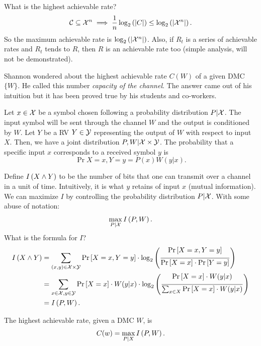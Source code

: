 What is the highest achievable rate?
\begin{equation*}
	\mathcal{C} \subseteq \mathcal{X}^n \implies \frac{1}{n} \log_2 \left( {\left|{C}\right|} \right) \le \log_2 \left( {\left|{\mathcal{X}^n}\right|} \right).
\end{equation*}
So the maximum achievable rate is $\log_2 \left( {\left|{\mathcal{X}^n}\right|} \right)$.
Also, if $R_t$ is a series of achievable rates and $R_t$ tends to $R$, then $R$ is an achievable rate too (simple analysis, will not be demonstrated).

Shannon wondered about the highest achievable rate $C(W)$ of a given DMC $\{W\}$.
He called this number \emph{capacity of the channel}.
The answer came out of his intuition but it has been proved true by his students and co-workers.

Let $x \in \mathcal{X}$ be a symbol chosen following a probability distribution $P|\mathcal{X}$.
The input symbol will be sent through the channel $W$ and the output is conditioned by $W$.
Let $Y$ be a \ac{RV} $Y \in \mathcal{Y}$ representing the output of $W$ with respect to input $X$.
Then, we have a joint distribution $P, W | \mathcal{X} \times \mathcal{Y}$.
The probability that a specific input $x$ corresponds to a received symbol $y$ is
\begin{equation*}
	\Pr{X = x, Y = y} = P(x) W(y|x).
\end{equation*}

Define $I \left( {X \land Y} \right)$ to be the number of bits that one can transmit over a channel in a unit of time.
Intuitively, it is what $y$ retains of input $x$ (mutual information).
We can maximize $I$ by controlling the probability distribution $P|\mathcal{X}$.
With some abuse of notation:
\begin{equation*}
	\max_{P|\mathcal{X}} I \left( {P, W} \right).
\end{equation*}
What is the formula for $I$?
\begin{align*}
	I \left( {X \land Y} \right)
	& =
	\sum_{(x, y) \in \mathcal{X} \times \mathcal{Y}}
	\mathop{\mathrm{Pr}}\limits_{} \left[ {X=x, Y=y} \right] \cdot
	\log_2 \left( {\frac{\mathop{\mathrm{Pr}}\limits_{} \left[ {X=x, Y=y} \right]}{\mathop{\mathrm{Pr}}\limits_{} \left[ {X=x} \right] \cdot \mathop{\mathrm{Pr}}\limits_{} \left[ {Y=y} \right]}} \right)
	\\
	& =
	\sum_{x \in \mathcal{X},  y \in \mathcal{Y}}
	\mathop{\mathrm{Pr}}\limits_{} \left[ {X=x} \right] \cdot W(y|x) \cdot
	\log_2 \left( {\frac{\mathop{\mathrm{Pr}}\limits_{} \left[ {X=x} \right] \cdot W(y|x)}{\sum_{x \in X} \mathop{\mathrm{Pr}}\limits_{} \left[ {X=x} \right] \cdot W(y|x)}} \right)
	\\
	& =
	I \left( {P, W} \right).
\end{align*}

\begin{thm}\label{thm:nct}
	The highest achievable rate, given a \ac{DMC} $W$, is
	\begin{equation*}
		C(w) = \max_{P|X} I \left( {P, W} \right).
	\end{equation*}
\end{thm}

